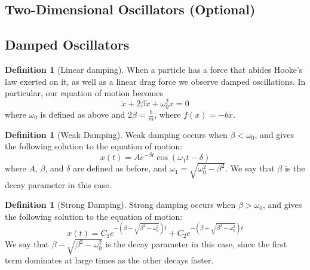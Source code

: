\documentclass[12pt]{article}
\theoremstyle{definition}
\newtheorem{defn}[thm]{Definition}
\theoremstyle{remark}
\numberwithin{equation}{section}
\begin{document}
\vspace{15pt}


\subsection{Two-Dimensional Oscillators (Optional)}





\subsection{Damped Oscillators}


\begin{defn}[Linear damping]
        When a particle has a force that abides Hooke's law exerted on it, as well as a linear drag force we observe damped oscillations. In particular, our equation of motion becomes \begin{equation}
                \ddot{x} + 2\beta\dot{x} + \omega_0^2x = 0
        \end{equation}
        where $\omega_0$ is defined as above and $2\beta = \frac{b}{m}$, where $f(x) = -b\dot{x}$.
\end{defn}

\vspace{15pt}

\begin{defn}[Weak Damping]
        Weak damping occurs when $\beta < \omega_0$, and gives the following solution to the equation of motion: \begin{equation}
                x(t) = Ae^{-\beta t}\cos(\omega_1 t - \delta)
        \end{equation}
        where $A$, $\beta$, and $\delta$ are defined as before, and $\omega_1 = \sqrt{\omega_0^2 - \beta^2}$. We say that $\beta$ is the decay parameter in this case.
\end{defn}

\vspace{15pt}

\begin{defn}[Strong Damping]
        Strong damping occurs when $\beta > \omega_0$, and gives the following solution to the equation of motion: \begin{equation}
                x(t) = C_1e^{-(\beta - \sqrt{\beta^2 - \omega_0^2})t}+C_2e^{-(\beta+\sqrt{\beta^2-\omega_0^2})t}
        \end{equation}
        We say that $\beta - \sqrt{\beta^2 - \omega_0^2}$ is the decay parameter in this case, since the first term dominates at large times as the other decays faster.
\end{defn}
\end{document}

